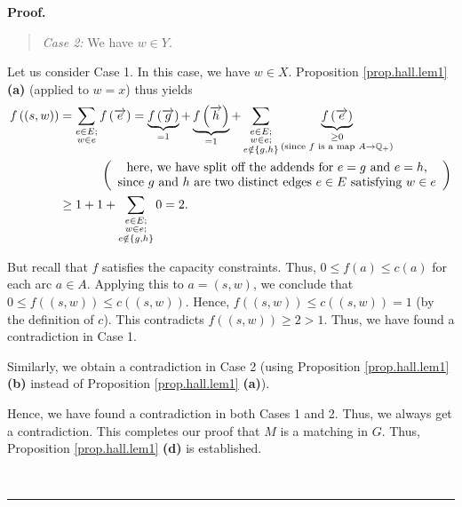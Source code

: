 \documentclass[numbers=enddot,12pt,final,onecolumn,notitlepage]{scrartcl}%
\theoremstyle{definition}
\newenvironment{statement}{\begin{quote}}{\end{quote}}
\newenvironment{proof}[1][Proof]{\noindent\textbf{#1.} }{\ \rule{0.5em}{0.5em}}
\let\sumnonlimits\sum
\renewcommand{\sum}{\sumnonlimits\limits}
\begin{document}
\begin{proof}
\begin{statement}
\textit{Case 2:} We have $w\in Y$.
\end{statement}

Let us consider Case 1. In this case, we have $w\in X$. Proposition
\ref{prop.hall.lem1} \textbf{(a)} (applied to $w=x$) thus yields%
\begin{align*}
f\left(  \left(  s,w\right)  \right)   &  =\sum_{\substack{e\in E;\\w\in
e}}f\left(  \overrightarrow{e}\right)  =\underbrace{f\left(
\overrightarrow{g}\right)  }_{=1}+\underbrace{f\left(  \overrightarrow{h}%
\right)  }_{=1}+\sum_{\substack{e\in E;\\w\in e;\\e\notin\left\{  g,h\right\}
}}\underbrace{f\left(  \overrightarrow{e}\right)  }_{\substack{\geq
0\\\text{(since }f\text{ is a map }A\rightarrow\mathbb{Q}_{+}\text{)}}}\\
&  \ \ \ \ \ \ \ \ \ \ \left(
\begin{array}
[c]{c}%
\text{here, we have split off the addends for }e=g\text{ and }e=h\text{,}\\
\text{since }g\text{ and }h\text{ are two distinct edges }e\in E\text{
satisfying }w\in e
\end{array}
\right) \\
&  \geq1+1+\sum_{\substack{e\in E;\\w\in e;\\e\notin\left\{  g,h\right\}
}}0=2.
\end{align*}


But recall that $f$ satisfies the capacity constraints. Thus, $0\leq f\left(
a\right)  \leq c\left(  a\right)  $ for each arc $a\in A$. Applying this to
$a=\left(  s,w\right)  $, we conclude that $0\leq f\left(  \left(  s,w\right)
\right)  \leq c\left(  \left(  s,w\right)  \right)  $. Hence, $f\left(
\left(  s,w\right)  \right)  \leq c\left(  \left(  s,w\right)  \right)  =1$
(by the definition of $c$). This contradicts $f\left(  \left(  s,w\right)
\right)  \geq2>1$. Thus, we have found a contradiction in Case 1.

Similarly, we obtain a contradiction in Case 2 (using Proposition
\ref{prop.hall.lem1} \textbf{(b)} instead of Proposition \ref{prop.hall.lem1}
\textbf{(a)}).

Hence, we have found a contradiction in both Cases 1 and 2. Thus, we always
get a contradiction. This completes our proof that $M$ is a matching in $G$.
Thus, Proposition \ref{prop.hall.lem1} \textbf{(d)} is established.


\end{proof}
\end{document}
